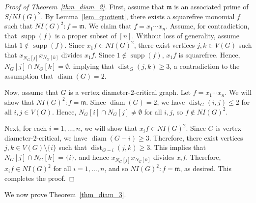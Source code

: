\documentclass[12pt,reqno,twoside]{amsart}
\newcommand{\mm}{\mathfrak m}
\DeclareMathOperator{\diam}{diam}
\DeclareMathOperator{\dist}{dist}
\DeclareMathOperator{\supp}{supp}
\theoremstyle{definition}
\theoremstyle{plain}
\theoremstyle{remark}
\numberwithin{equation}{section}
\begin{document}
\begin{proof}[Proof of Theorem~\ref{thm_diam_2}]
First, assume that $\mm$ is an associated prime of $S/NI(G)^2$. By Lemma~\ref{lem_quotient}, there exists a squarefree monomial $f$ such that $NI(G)^2 : f = \mm$. We claim that $f = x_1 \cdots x_n$. Assume, for contradiction, that $\supp(f)$ is a proper subset of $[n]$. Without loss of generality, assume that $1 \notin \supp(f)$. Since $x_1 f \in NI(G)^2$, there exist vertices $j, k \in V(G)$ such that $x_{N_G[j]} x_{N_G[k]}$ divides $x_1 f$. Since $1 \notin \supp(f)$, $x_1f$ is squarefree. Hence, $N_G[j] \cap N_G[k] = \emptyset$, implying that $\dist_G(j,k) \geq 3$, a contradiction to the assumption that $\diam(G) = 2$.

Now, assume that $G$ is a vertex diameter-$2$-critical graph. Let $f = x_1 \cdots x_n$. We will show that $NI(G)^2 : f = \mm$. Since $\diam(G) = 2$, we have $\dist_G(i,j) \leq 2$ for all $i, j \in V(G)$. Hence, $N_G[i] \cap N_G[j] \neq \emptyset$ for all $i, j$, so $f \notin NI(G)^2$.

Next, for each $i = 1, \ldots, n$, we will show that $x_i f \in NI(G)^2$. Since $G$ is vertex diameter-$2$-critical, we have $\diam(G - i) \geq 3$. Therefore, there exist vertices $j, k \in V(G) \setminus \{i\}$ such that $\dist_{G - i}(j, k) \geq 3$. This implies that $N_G[j] \cap N_G[k] = \{i\}$, and hence $x_{N_G[j]} x_{N_G[k]}$ divides $x_i f$. Therefore, $x_i f \in NI(G)^2$ for all $i = 1, \ldots, n$, and so $NI(G)^2 : f = \mm$, as desired. This completes the proof.
\end{proof}

We now prove Theorem~\ref{thm_diam_3}.
\end{document}
